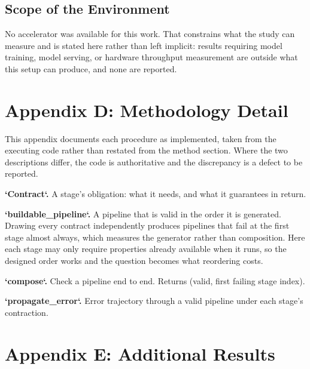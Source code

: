 \documentclass[10pt,journal,compsoc,twocolumn]{IEEEtran}
\begin{document}
\subsection{Scope of the Environment}


No accelerator was available for this work. That constrains what the study can measure and is stated here rather than left implicit: results requiring model training, model serving, or hardware throughput measurement are outside what this setup can produce, and none are reported.




\section{Appendix D: Methodology Detail}


This appendix documents each procedure as implemented, taken from the executing code rather than restated from the method section. Where the two descriptions differ, the code is authoritative and the discrepancy is a defect to be reported.

\textbf{`Contract`.} A stage's obligation: what it needs, and what it guarantees in return.

\textbf{`buildable\_pipeline`.} A pipeline that is valid in the order it is generated. Drawing every contract independently produces pipelines that fail at the first stage almost always, which measures the generator rather than composition. Here each stage may only require properties already available when it runs, so the designed order works and the question becomes what reordering costs.

\textbf{`compose`.} Check a pipeline end to end. Returns (valid, first failing stage index).

\textbf{`propagate\_error`.} Error trajectory through a valid pipeline under each stage's contraction.




\section{Appendix E: Additional Results}
\end{document}
